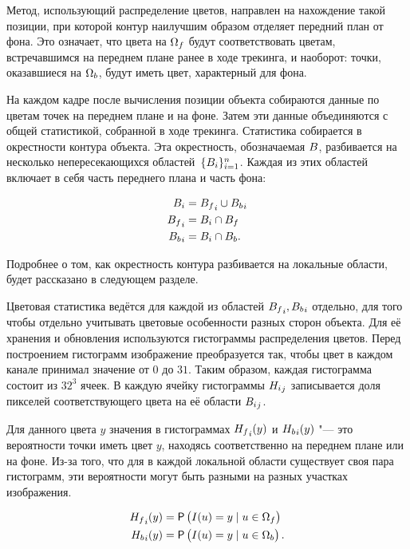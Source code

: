 Метод, использующий распределение цветов, направлен на нахождение такой
позиции, при которой контур наилучшим образом отделяет передний план от фона.
Это означает, что цвета на $\Omega_f$ будут соответствовать цветам,
встречавшимся на переднем плане ранее в ходе трекинга, и наоборот: точки,
оказавшиеся на $\Omega_b$, будут иметь цвет, характерный для фона.

На каждом кадре после вычисления позиции объекта собираются данные по цветам
точек на переднем плане и на фоне.
Затем эти данные объединяются с общей статистикой, собранной в ходе трекинга.
Статистика собирается в окрестности контура объекта.
Эта окрестность, обозначаемая $B$, разбивается на несколько
непересекающихся областей~$\{B_i\}_{i = 1}^n$.
Каждая из этих областей включает в себя часть переднего плана и часть фона:

\begin{align}
\label{eqn:histo_partitioning}
B_i &= {B_f}_i \cup {\ensuremath{B_b}}_i \\
{B_f}_i &= B_i \cap B_f \\
{B_b}_i &= B_i \cap B_b
\text{.}
\end{align}

Подробнее о том, как окрестность контура разбивается на локальные области,
будет
рассказано в следующем разделе.

Цветовая статистика ведётся для каждой из областей ${B_f}_i,
{B_b}_i$ отдельно, для того чтобы отдельно учитывать цветовые
особенности разных сторон объекта.
Для её хранения и обновления используются гистограммы распределения цветов.
Перед построением гистограмм изображение преобразуется так, чтобы цвет в каждом
канале принимал значение от $0$ до $31$.
Таким образом, каждая гистограмма состоит из $32^3$ ячеек.
В каждую ячейку гистограммы ${H_i}_j$ записывается доля пикселей
соответствующего цвета на её области ${B_i}_j$.

Для данного цвета $y$ значения в гистограммах ${H_f}_i(y)$ и
${H_b}_i(y)$ "--- это вероятности точки иметь цвет $y$, находясь
соответственно на переднем плане или на фоне.
Из-за того, что для в каждой локальной области существует своя пара гистограмм,
эти вероятности могут быть разными на разных участках изображения.

\begin{align}
\label{eqn:H_f_Y}
    {\ensuremath{H_f}}_i(y) &= \mathsf{P} \left( I(\mathnormal{u}) = y \mid \mathnormal{u} \in \Omega_f \right) \\
    {H_b}_i(y) &= \mathsf{P} \left( I(\mathnormal{u}) = y \mid \mathnormal{u} \in \Omega_b \right)
\text{.}
\end{align}

